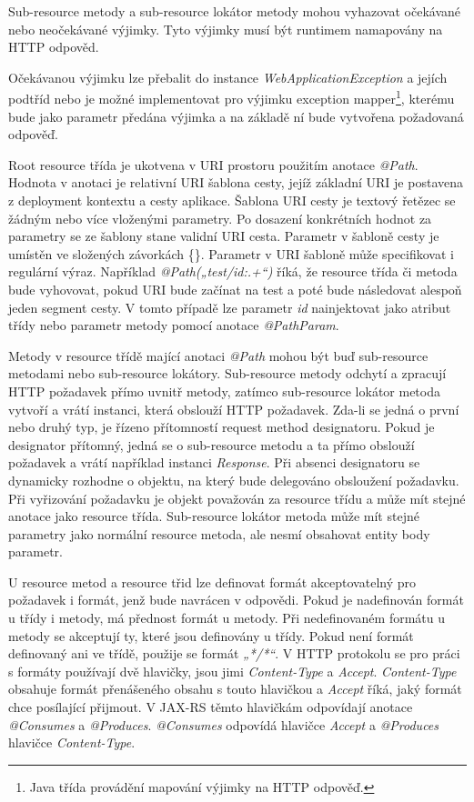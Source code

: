 \documentclass[11pt,twoside,a4paper]{book}
\begin{document}
Sub-resource metody a sub-resource lokátor metody mohou vyhazovat očekávané
nebo neočekávané výjimky. Tyto výjimky musí být runtimem namapovány na HTTP odpověd.

Očekávanou výjimku lze přebalit do instance {\em WebApplicationException} a
jejích podtříd nebo je možné implementovat pro výjimku exception
mapper\footnote{Java třída provádění mapování výjimky na HTTP odpověď.}, kterému
bude jako parametr předána výjimka a na základě ní bude vytvořena požadovaná
odpověď.

Root resource třída je ukotvena v URI prostoru použitím anotace {\em @Path}.
Hodnota v anotaci je relativní URI šablona cesty, jejíž základní URI je postavena z deployment kontextu a cesty
aplikace. Šablona URI cesty je textový řetězec se žádným nebo více vloženými
parametry. Po dosazení konkrétních hodnot za parametry se ze šablony stane validní URI cesta. Parametr v
šabloně cesty je umístěn ve složených závorkách \{\}. Parametr v URI šabloně
může specifikovat i regulární výraz. Například {\em @Path(„test/{id:.+}“)} říká,
že resource třída či metoda bude vyhovovat, pokud URI bude začínat na test a poté bude následovat alespoň jeden
segment cesty. V tomto případě lze parametr {\em id} nainjektovat jako atribut
třídy nebo parametr metody pomocí anotace {\em @PathParam}.

Metody v resource třídě mající anotaci {\em @Path} mohou být buď sub-resource
metodami nebo sub-resource lokátory. Sub-resource metody odchytí a zpracují HTTP požadavek přímo uvnitř
metody, zatímco sub-resource lokátor metoda vytvoří a vrátí instanci, která obslouží HTTP
požadavek. Zda-li se jedná o první nebo druhý typ, je řízeno přítomností request method
designatoru. Pokud je designator přítomný, jedná se o sub-resource metodu a ta přímo
obslouží požadavek a vrátí například instanci {\em Response}. Při absenci designatoru se dynamicky
rozhodne o objektu, na který bude delegováno obsloužení požadavku. Při vyřizování
požadavku je objekt považován za resource třídu a může mít stejné anotace jako resource
třída. Sub-resource lokátor metoda může mít stejné parametry jako normální resource metoda,
ale nesmí obsahovat entity body parametr.

U resource metod a resource třid lze definovat formát akceptovatelný pro
požadavek i formát, jenž bude navrácen v odpovědi. Pokud je nadefinován formát u
třídy i metody, má přednost formát u metody. Při nedefinovaném formátu
u metody se akceptují ty, které jsou definovány u třídy. Pokud není formát
definovaný ani ve třídě, použije se formát {\em „*/*“}. V HTTP protokolu se pro
práci s formáty používají dvě hlavičky, jsou jimi {\em Content-Type} a {\em
Accept}.
{\em Content-Type} obsahuje formát přenášeného obsahu s touto hlavičkou a {\em
Accept} říká, jaký formát chce posílající přijmout. V JAX-RS těmto hlavičkám
odpovídají anotace {\em @Consumes} a {\em @Produces}. {\em @Consumes} odpovídá
hlavičce {\em Accept} a {\em @Produces} hlavičce {\em Content-Type}.
\end{document}
